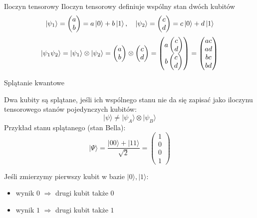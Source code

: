 

\begin{frame}{Iloczyn tensorowy}
Iloczyn tensorowy definiuje wspólny stan dwóch kubitów
\[
\ket{\psi_1} = \begin{pmatrix} a \\ b \end{pmatrix} = a\ket{0} + b\ket{1}, \quad
\ket{\psi_2} = \begin{pmatrix} c \\ d \end{pmatrix} = c\ket{0} + d\ket{1}
\]
\[
\ket{\psi_1 \psi_2}=\ket{\psi_1} \otimes \ket{\psi_2} =
\begin{pmatrix} a \\ b \end{pmatrix} \otimes 
\begin{pmatrix} c \\ d \end{pmatrix} =
\begin{pmatrix}
a \begin{pmatrix}
    c \\ d
\end{pmatrix}\\b \begin{pmatrix}
    c \\ d
\end{pmatrix}
\end{pmatrix}
=
\begin{pmatrix}
a c \\ a d \\ b c \\ b d
\end{pmatrix}
\]

\end{frame}




\begin{frame}{Splątanie kwantowe}

Dwa kubity są splątane, jeśli ich wspólnego stanu nie da się zapisać jako
iloczynu tensorowego stanów pojedynczych kubitów:
\[
|\psi\rangle \neq |\psi_A\rangle \otimes |\psi_B\rangle
\]
\pause
Przykład stanu splątanego (stan Bella):
\vspace{-2em}
\[
|\Psi\rangle = \frac{|00\rangle + |11\rangle}{\sqrt{2}}=\begin{pmatrix}
    1 \\0 \\0 \\1
\end{pmatrix}
\]
\vspace{-2em}

Jeśli zmierzymy pierwszy kubit w bazie $|0\rangle, |1\rangle$:

\begin{itemize}
\item wynik $0$ $\Rightarrow$ drugi kubit także $0$
\item wynik $1$ $\Rightarrow$ drugi kubit także $1$
\end{itemize}

\end{frame}

